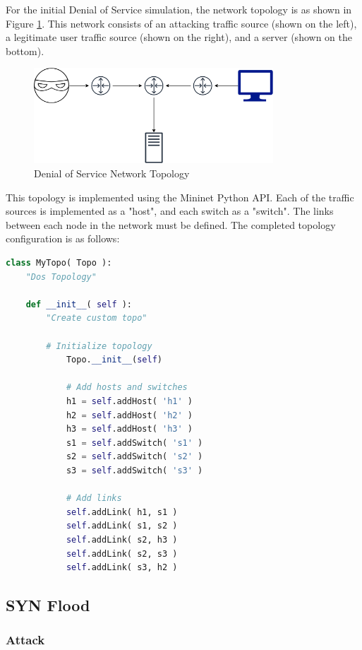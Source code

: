 For the initial Denial of Service simulation, the network topology is as shown
in Figure \ref{fig:dosNetwork}. This network consists of an attacking traffic
source (shown on the left), a legitimate user traffic source (shown on the
right), and a server (shown on the bottom).

\begin{figure}[H]
	\centering
	\includegraphics[width=0.8\textwidth]{images/DoS}
	\caption{Denial of Service Network Topology}
	\label{fig:dosNetwork}
\end{figure}

This topology is implemented using the Mininet Python API. Each of the traffic
sources is implemented as a "host", and each switch as a "switch". The links
between each node in the network must be defined. The completed topology
configuration is as follows:

\begin{lstlisting}[language=python, caption=DoS Simulation Network Topology]
class MyTopo( Topo ):
	"Dos Topology"

	def __init__( self ):
		"Create custom topo"

		# Initialize topology
	        Topo.__init__(self)

	        # Add hosts and switches
	        h1 = self.addHost( 'h1' )
	        h2 = self.addHost( 'h2' )
	        h3 = self.addHost( 'h3' )
	        s1 = self.addSwitch( 's1' )
	        s2 = self.addSwitch( 's2' )
	        s3 = self.addSwitch( 's3' )

	        # Add links
	        self.addLink( h1, s1 )
	        self.addLink( s1, s2 )
	        self.addLink( s2, h3 )
	        self.addLink( s2, s3 )
	        self.addLink( s3, h2 )
\end{lstlisting}

\subsection{SYN Flood}

\subsubsection{Attack}

